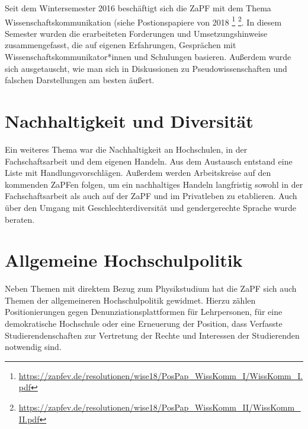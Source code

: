 Seit dem Wintersemester 2016 beschäftigt sich die ZaPF mit dem Thema  Wissenschaftskommunikation (siehe Postionspapiere von 2018 \footnote{\url{https://zapfev.de/resolutionen/wise18/PosPap_WissKomm_I/WissKomm_I.pdf}} \footnote{\url{https://zapfev.de/resolutionen/wise18/PosPap_WissKomm_II/WissKomm_II.pdf}}. In diesem Semester wurden die erarbeiteten Forderungen und Umsetzungshinweise  zusammengefasst, die auf eigenen Erfahrungen, Gesprächen mit Wissenschaftskommunikator*innen und Schulungen basieren. Außerdem wurde sich ausgetauscht, wie man sich in Diskussionen zu Pseudowissenschaften und falschen Darstellungen am besten äußert.

\section*{Nachhaltigkeit und Diversität}

Ein weiteres Thema war die Nachhaltigkeit an Hochschulen, in der Fachschaftsarbeit und dem eigenen Handeln. Aus dem Austausch entstand eine Liste mit Handlungsvorschlägen. Außerdem werden Arbeitskreise auf den kommenden ZaPFen folgen, um ein nachhaltiges Handeln langfristig sowohl in der Fachschaftsarbeit als auch auf der ZaPF und im Privatleben zu etablieren. Auch über den Umgang mit Geschlechterdiversität und gendergerechte Sprache wurde beraten.

\section*{Allgemeine Hochschulpolitik}

Neben Themen mit direktem Bezug zum Physikstudium hat die ZaPF sich auch Themen der allgemeineren Hochschulpolitik gewidmet. Hierzu zählen Positionierungen gegen Denunziationsplattformen für Lehrpersonen, für eine demokratische Hochschule oder eine Erneuerung der Position, dass Verfasste Studierendenschaften zur Vertretung der Rechte und Interessen der Studierenden notwendig sind.

